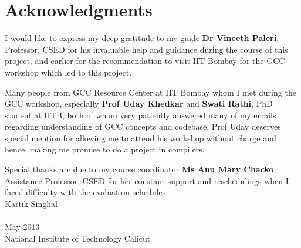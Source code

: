 \cleardoublepage
{}
{}
\chapter*{Acknowledgments}
\vspace{1.0in}
I would like to express my deep gratitude to my guide \textbf{Dr Vineeth Paleri}, Professor, CSED for his invaluable help and guidance during the course of this project, and earlier for the recommendation to visit IIT Bombay for the GCC workshop which led to this project.

Many people from GCC Resource Center at IIT Bombay whom I met during the GCC workshop, especially \textbf{Prof Uday Khedkar} and \textbf{Swati Rathi}, PhD student at IITB, both of whom very patiently answered many of my emails regarding understanding of GCC concepts and codebase. Prof Uday deserves special mention for allowing me to attend his workshop without charge and hence, making me promise to do a project in compilers.

Special thanks are due to my course coordinator \textbf{Ms Anu Mary Chacko}, Assistance Professor, CSED for her constant support and reschedulings when I faced difficulty with the evaluation schedules.\\[3.0cm]
Kartik Singhal\\
\\
May 2013\\
{National Institute of Technology Calicut}\\
\newpage
